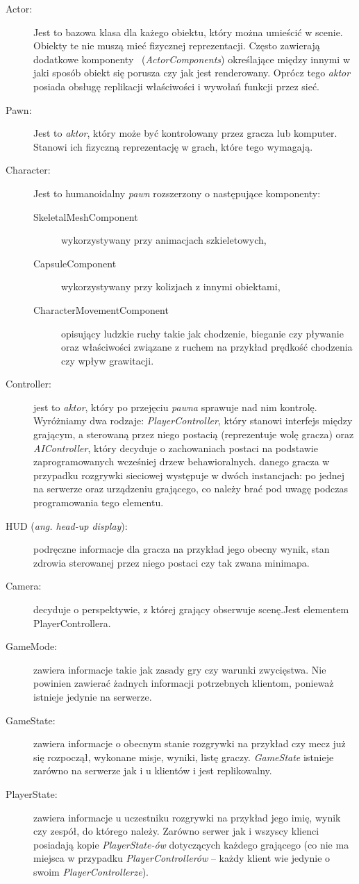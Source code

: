 \documentclass[multip]{SGGW-thesis}
\begin{document}
\begin{description}
\item[Actor:]Jest to bazowa klasa dla każego obiektu, który można umieścić w scenie. Obiekty te nie muszą mieć fizycznej reprezentacji. Często zawierają dodatkowe komponenty ~({\em ActorComponents}) określające między innymi w jaki sposób obiekt się porusza czy jak jest renderowany. Oprócz tego {\em aktor} posiada obsługę replikacji właściwości i wywołań funkcji przez sieć.
\item[Pawn:]Jest to {\em aktor}, który może być kontrolowany przez gracza lub komputer. Stanowi ich fizyczną reprezentację w grach, które tego wymagają.
\item[Character:]Jest to humanoidalny {\em pawn} rozszerzony o następujące komponenty:
	\begin{description}
	\item[SkeletalMeshComponent] wykorzystywany przy animacjach szkieletowych,
	\item[CapsuleComponent] wykorzystywany przy kolizjach z innymi obiektami,
	\item[CharacterMovementComponent] opisujący ludzkie ruchy takie jak chodzenie, bieganie czy pływanie oraz właściwości związane z ruchem na przykład prędkość chodzenia czy wpływ grawitacji.
	\end{description}
\item[Controller:] jest to {\em aktor}, który po przejęciu {\em pawna} sprawuje nad nim kontrolę. Wyróżniamy dwa rodzaje: {\em PlayerController}, który stanowi interfejs między grającym, a sterowaną przez niego postacią (reprezentuje wolę gracza) oraz {\em AIController}, który decyduje o zachowaniach postaci na podstawie zaprogramowanych wcześniej drzew behawioralnych.
 danego gracza w przypadku rozgrywki sieciowej występuje w dwóch instancjach: po jednej na serwerze oraz urządzeniu grającego, co należy brać pod uwagę podczas programowania tego elementu.
\item[HUD ({\em ang. head-up display}):] podręczne informacje dla gracza na przykład jego obecny wynik, stan zdrowia sterowanej przez niego postaci czy tak zwana minimapa.
\item[Camera:] decyduje o perspektywie, z której grający obserwuje scenę.\newline Jest elementem PlayerControllera.
\item[GameMode:] zawiera informacje takie jak zasady gry czy warunki zwycięstwa. Nie powinien zawierać żadnych informacji potrzebnych klientom, ponieważ istnieje jedynie na serwerze.
\item[GameState:] zawiera informacje o obecnym stanie rozgrywki na przykład czy mecz już się rozpoczął, wykonane misje, wyniki, listę graczy. {\em GameState} istnieje zarówno na serwerze jak i u klientów i jest replikowalny.
\item[PlayerState:] zawiera informacje u uczestniku rozgrywki na przykład jego imię, wynik czy zespół, do którego należy. Zarówno serwer jak i wszyscy klienci posiadają kopie {\em PlayerState-ów} dotyczących każdego grającego (co nie ma miejsca w przypadku {\em PlayerControllerów} -- każdy klient wie jedynie o swoim {\em PlayerControllerze}).


\end{description}
\end{document}
